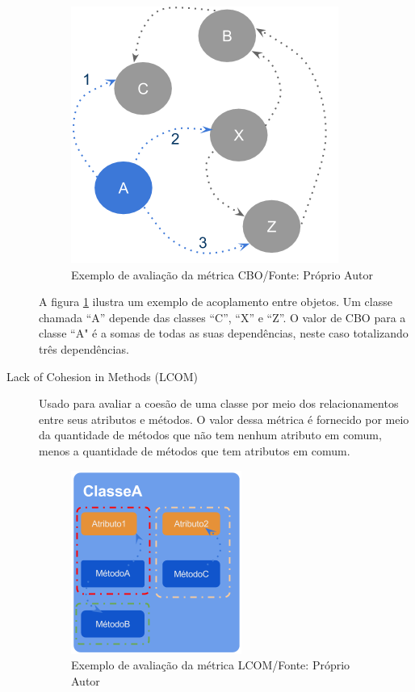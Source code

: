 \begin{description}
\begin{figure}[!ht]
	\centering
	\includegraphics[scale=0.8]{img/pic_cbo.png}
	\caption{Exemplo de avaliação da métrica CBO/Fonte: Próprio Autor}
	\label{fig:pic_cbo}
\end{figure}

A figura \ref{fig:pic_cbo} ilustra um exemplo de acoplamento entre objetos. Um
classe chamada ``A'' depende das classes ``C'', ``X'' e ``Z''. O
valor de CBO para a classe ``A" é a somas de todas as suas
dependências, neste caso totalizando três dependências.


\item[Lack of Cohesion in Methods (LCOM)] Usado para avaliar a coesão de uma
classe por meio dos relacionamentos entre seus atributos e métodos.
O valor dessa métrica é fornecido por meio da quantidade de métodos que não tem
nenhum atributo em comum, menos a quantidade de métodos que tem atributos em
comum.

\begin{figure}[!h]
	\centering
	\includegraphics[scale=0.8]{img/pic_lcom_ex1.png}
	\caption{Exemplo  de avaliação da métrica LCOM/Fonte: Próprio Autor}
	\label{fig:pic_lcom_ex1}
\end{figure}


\end{description}

